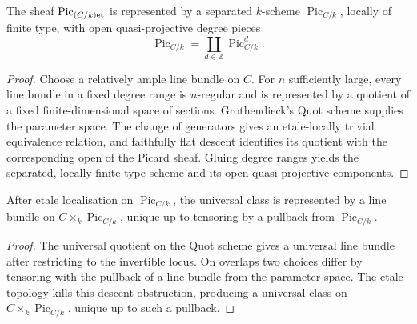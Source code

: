 \begin{theorem}
  \label{pa-thm-picard-representability}
  \cite[Thm.~4.8]{kleiman-picard}
  The sheaf \(\operatorname{Pic}_{(C/k)\mathrm{et}}\) is represented by a separated
  \(k\)-scheme \(\operatorname{Pic}_{C/k}\), locally of finite type, with open
  quasi-projective degree pieces
  \[
    \operatorname{Pic}_{C/k}=\coprod_{d\in\mathbb Z}\operatorname{Pic}^d_{C/k}.
  \]
\end{theorem}

\begin{proof}
  Choose a relatively ample line bundle on \(C\).  For \(n\) sufficiently
  large, every line bundle in a fixed degree range is \(n\)-regular and is
  represented by a quotient of a fixed finite-dimensional space of sections.
  Grothendieck's Quot scheme supplies the parameter space.  The change of
  generators gives an etale-locally trivial equivalence relation, and
  faithfully flat descent identifies its quotient with the corresponding
  open of the Picard sheaf.  Gluing degree ranges yields the separated,
  locally finite-type scheme and its open quasi-projective components.
\end{proof}

\begin{proposition}
  \label{pa-prop-poincare}
  \cite[Ex.~4.3]{kleiman-picard}
  After etale localisation on \(\operatorname{Pic}_{C/k}\), the universal class
  is represented by a line bundle on
  \(C\times_k\operatorname{Pic}_{C/k}\), unique up to tensoring by a pullback
  from \(\operatorname{Pic}_{C/k}\).
\end{proposition}

\begin{proof}
  The universal quotient on the Quot scheme gives a universal line bundle
  after restricting to the invertible locus.  On overlaps two choices differ
  by tensoring with the pullback of a line bundle from the parameter space.
  The etale topology kills this descent obstruction, producing a universal
  class on \(C\times_k\operatorname{Pic}_{C/k}\), unique up to such a
  pullback.
\end{proof}
